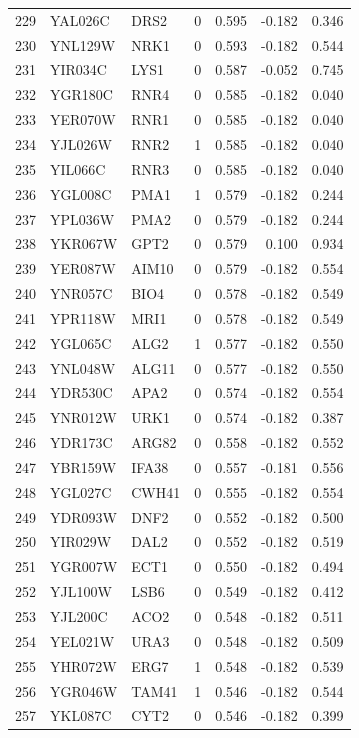 \begin{longtable}{rllrrrr}
229 & YAL026C & DRS2 & 0 & 0.595 & -0.182 & 0.346\\
230 & YNL129W & NRK1 & 0 & 0.593 & -0.182 & 0.544\\
231 & YIR034C & LYS1 & 0 & 0.587 & -0.052 & 0.745\\
232 & YGR180C & RNR4 & 0 & 0.585 & -0.182 & 0.040\\
233 & YER070W & RNR1 & 0 & 0.585 & -0.182 & 0.040\\
234 & YJL026W & RNR2 & 1 & 0.585 & -0.182 & 0.040\\
235 & YIL066C & RNR3 & 0 & 0.585 & -0.182 & 0.040\\
236 & YGL008C & PMA1 & 1 & 0.579 & -0.182 & 0.244\\
237 & YPL036W & PMA2 & 0 & 0.579 & -0.182 & 0.244\\
238 & YKR067W & GPT2 & 0 & 0.579 & 0.100 & 0.934\\
239 & YER087W & AIM10 & 0 & 0.579 & -0.182 & 0.554\\
240 & YNR057C & BIO4 & 0 & 0.578 & -0.182 & 0.549\\
241 & YPR118W & MRI1 & 0 & 0.578 & -0.182 & 0.549\\
242 & YGL065C & ALG2 & 1 & 0.577 & -0.182 & 0.550\\
243 & YNL048W & ALG11 & 0 & 0.577 & -0.182 & 0.550\\
244 & YDR530C & APA2 & 0 & 0.574 & -0.182 & 0.554\\
245 & YNR012W & URK1 & 0 & 0.574 & -0.182 & 0.387\\
246 & YDR173C & ARG82 & 0 & 0.558 & -0.182 & 0.552\\
247 & YBR159W & IFA38 & 0 & 0.557 & -0.181 & 0.556\\
248 & YGL027C & CWH41 & 0 & 0.555 & -0.182 & 0.554\\
249 & YDR093W & DNF2 & 0 & 0.552 & -0.182 & 0.500\\
250 & YIR029W & DAL2 & 0 & 0.552 & -0.182 & 0.519\\
251 & YGR007W & ECT1 & 0 & 0.550 & -0.182 & 0.494\\
252 & YJL100W & LSB6 & 0 & 0.549 & -0.182 & 0.412\\
253 & YJL200C & ACO2 & 0 & 0.548 & -0.182 & 0.511\\
254 & YEL021W & URA3 & 0 & 0.548 & -0.182 & 0.509\\
255 & YHR072W & ERG7 & 1 & 0.548 & -0.182 & 0.539\\
256 & YGR046W & TAM41 & 1 & 0.546 & -0.182 & 0.544\\
257 & YKL087C & CYT2 & 0 & 0.546 & -0.182 & 0.399\\

\end{longtable}
